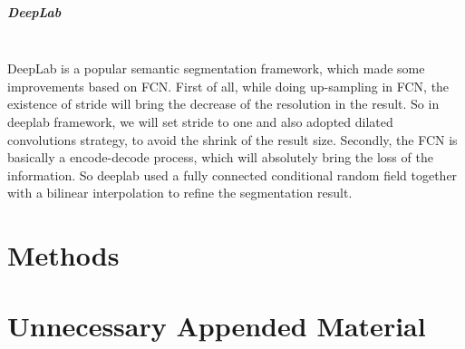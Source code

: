 \documentclass{kththesis}
\begin{document}
\paragraph{DeepLab}~{}\\
DeepLab\cite{chen2016deeplab} is a popular semantic segmentation framework, which made some improvements based on FCN. First of all, while doing up-sampling in FCN, the existence of stride will bring the decrease of the resolution in the result. So in deeplab framework, we will set stride to one and also adopted dilated convolutions\cite{yu2015multi} strategy, to avoid the shrink of the result size. Secondly, the FCN is basically a encode-decode process, which will absolutely bring the loss of the information. So deeplab used a fully connected conditional random field\cite{krahenbuhl2011efficient} together with a bilinear interpolation to refine the segmentation result. 


\chapter{Methods}


\printbibliography[heading=bibintoc] %

\appendix

\chapter{Unnecessary Appended Material}
\end{document}
